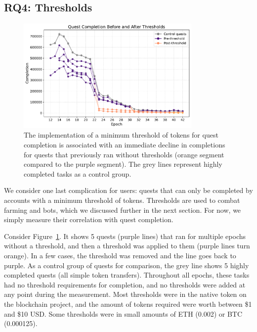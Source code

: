 
\subsection{RQ4: Thresholds}

\begin{figure}[t]
    \centering
    \includegraphics[width=0.8\textwidth]{figures/threshold.pdf}
    \caption{The implementation of a minimum threshold of tokens for quest completion is associated with an immediate decline in completions for quests that previously ran without thresholds (orange segment compared to the purple segment). The grey lines represent highly completed tasks as a control group.\label{fig:threshold}}
\end{figure}

We consider one last complication for users: quests that can only be completed by accounts with a minimum threshold of tokens. Thresholds are used to combat farming and bots, which we discussed further in the next section. For now, we simply measure their correlation with quest completion. 

Consider Figure~\ref{fig:threshold}. It shows 5 quests (purple lines) that ran for multiple epochs without a threshold, and then a threshold was applied to them (purple lines turn orange). In a few cases, the threshold was removed and the line goes back to purple. As a control group of quests for comparison, the grey line shows 5 highly completed quests (all simple token transfers). Throughout all epochs, these tasks had no threshold requirements for completion, and no thresholds were added at any point during the measurement. Most thresholds were in the native token on the blockchain project, and the amount of tokens required were worth between \$1 and \$10 USD. Some thresholds were in small amounts of ETH (0.002) or BTC (0.000125). 

